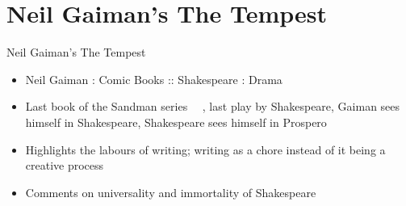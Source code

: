 \documentclass{beamer}
\begin{document}

  \section{Neil Gaiman's The Tempest}
  \begin{frame}{Neil Gaiman's The Tempest}
    \begin{itemize}
      \item Neil Gaiman : Comic Books :: Shakespeare : Drama
      \item Last book of the Sandman series ~\cite{gaimanmnd}~\cite{gaimantempest}, last play by Shakespeare, Gaiman sees himself in Shakespeare, Shakespeare sees himself in Prospero
      \item Highlights the labours of writing; writing as a chore instead of it being a creative process
      \item Comments on universality and immortality of Shakespeare
    \end{itemize}
  \end{frame}
  
\end{document}
